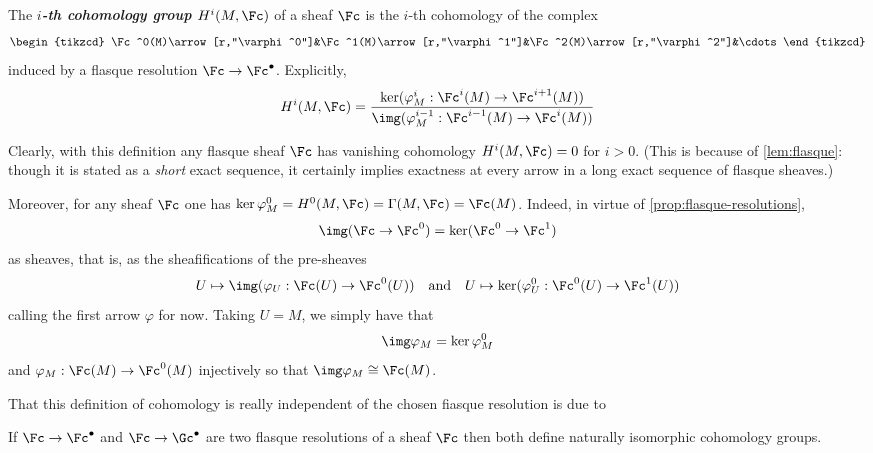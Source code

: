 \begin{defn}
	The \textbf{\textit{$i$-th cohomology group $H^i(M,\Fc)$}} of a sheaf $\Fc$ is the $i$-th cohomology of the complex
	\[\begin{tikzcd}
		\Fc^0(M)\arrow[r,"\varphi^0"]&\Fc^1(M)\arrow[r,"\varphi^1"]&\Fc^2(M)\arrow[r,"\varphi^2"]&\cdots
	\end{tikzcd}\]
	{\color{cyan}induced by a flasque resolution} $\Fc\to\Fc^\bullet$. Explicitly,
	\[H^i(M,\Fc)=\dfrac{\ker(\varphi^i_M:\Fc^i(M)\to\Fc^{i+1}(M))}{\img(\varphi^{i-1}_M:\Fc^{i-1}(M)\to\Fc^i(M))}\]
\end{defn}
Clearly, with this definition any flasque sheaf $\Fc$ has vanishing cohomology $H^i(M,\Fc)=0$ for $i>0$. (This is because of \cref{lem:flasque}: though it is stated as a \textit{short} exact sequence, it certainly implies exactness at every arrow in a long exact sequence of flasque sheaves.)

Moreover, for any sheaf $\Fc$ one has $\ker\varphi_M^0=H^0(M,\Fc)=\Gamma(M,\Fc)=\Fc(M)$. Indeed, in virtue of \cref{prop:flasque-resolutions}, \[\img(\Fc\to\Fc^0)=\ker(\Fc^0\to\Fc^1)\]
as sheaves, that is, as the sheafifications of the pre-sheaves
\[U\mapsto\img (\varphi_U:\Fc(U)\to\Fc^0(U))\quad \text{and}\quad U\mapsto\ker(\varphi^0_U:\Fc^0(U)\to\Fc^1(U))\]
calling the first arrow $\varphi$ for now. Taking $U=M$, we simply have that
\[\img\varphi_M=\ker\varphi^0_M\]
and $\varphi_M:\Fc(M)\to\Fc^0(M)$ injectively so that $\img\varphi_M\cong\Fc(M)$.

That this definition of cohomology is really independent of the chosen fiasque resolution is due to
\begin{prop}
	If $\Fc\to\Fc^\bullet$ and $\Fc\to\Gc^\bullet$ are two flasque resolutions of a sheaf $\Fc$ then both define naturally isomorphic cohomology groups.
\end{prop}

